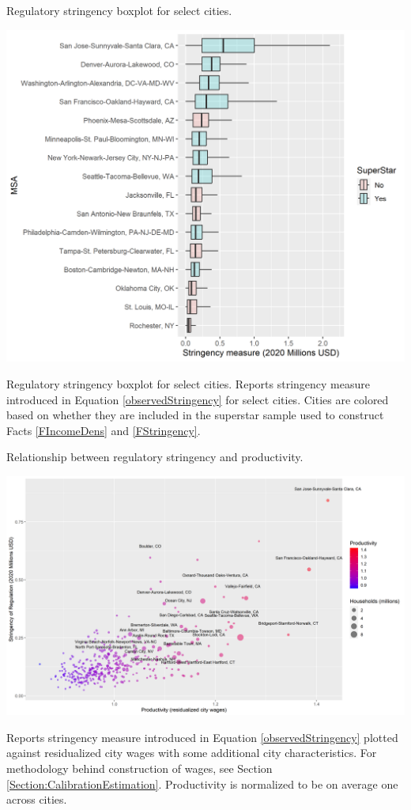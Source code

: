 \documentclass[12pt]{article}
\begin{document}
	\clearpage
	\begin{table}[htbp!]	
		\caption{Regulatory stringency boxplot for select cities.}\label{table:BoxplotStringency}
		\includegraphics[width=\textwidth]{Facts_incomeStringency_boxplot.png}
		\caption*{Regulatory stringency boxplot for select cities. Reports stringency measure introduced in Equation \eqref{observedStringency} for select cities. Cities are colored based on whether they are included in the superstar sample used to construct Facts \ref{FIncomeDens} and \ref{FStringency}. }
	\end{table}
	
	\begin{table}[htbp!]	
		\caption{Relationship between regulatory stringency and productivity.}\label{table:ProductivityStringency}
		\includegraphics[width=1.1\textwidth]{ProductivityStringency.png}
		\caption*{Reports stringency measure introduced in Equation \eqref{observedStringency} plotted against residualized city wages with some additional city characteristics. For methodology behind construction of wages, see Section \ref{Section:CalibrationEstimation}. Productivity is normalized to be on average one across cities.}
	\end{table}
	
\end{document}

